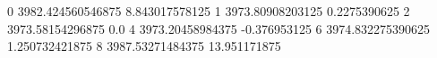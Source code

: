0 3982.424560546875 8.843017578125
1 3973.80908203125 0.2275390625
2 3973.58154296875 0.0
4 3973.20458984375 -0.376953125
6 3974.832275390625 1.250732421875
8 3987.53271484375 13.951171875

